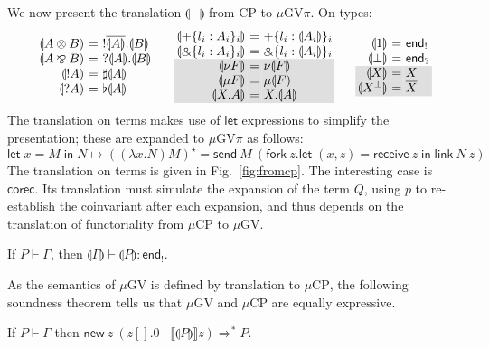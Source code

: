 \documentclass[orivec,envcountsame]{llncs}
\makeatletter
\newcommand{\with}{\mathbin\binampersand}
\newcommand{\parr}{\mathbin\bindnasrepma}
\newcommand{\cpdual}[1]{#1^\perp}
\newcommand{\cpbang}[1]{{! #1}}
\newcommand{\cpquery}[1]{{? #1}}
\newcommand{\gvdual}[1]{\overline{#1}}
\newcommand{\gvout}[2]{{!#1.#2}}
\newcommand{\gvin}[2]{{?#1.#2}}
\newcommand{\outterm}{\mkwd{end}_!}
\newcommand{\interm}{\mkwd{end}_?}
\newcommand{\gvserver}[1]{\flat #1}
\newcommand{\gvservice}[1]{\sharp #1}
\newcommand{\cptyp}[2]{#1 \vdash #2}
\newcommand{\gvtyp}[3]{#1 \vdash #2 : #3}
\newcommand{\mkwd}[1]{\mathsf{#1}}
\newcommand{\cut}[4]{\mkwd{new}\:#1 \: (#3 \mid #4)}
\newcommand{\gvsend}[2]{\mkwd{send}\:#1\:#2}
\newcommand{\gvreceive}[1]{\mkwd{receive}\:#1}
\newcommand{\gvlet}[3]{\mkwd{let}\;#1 = #2\;\mkwd{in}\;#3}
\newcommand{\gvlink}[2]{\mkwd{link}\:#1\:#2}
\newcommand{\gvfork}[2]{\mkwd{fork}\:#1.#2}
\newcommand{\gvreceivek}[4]{\gvlet{({#1}, {#2})}{\gvreceive{#3}}{#4}}
\newcommand{\key}{\mkwd}
\newcommand{\tocp}[1]{\llbracket #1 \rrbracket}
\newcommand{\togv}[1]{\llparenthesis #1 \rrparenthesis}
\newcommand{\topi}[1]{({#1})^\star}
\newcommand{\mucp}{$\mu\mathrm{CP}$\xspace}
\newcommand{\mugv}{$\mu\mathrm{GV}$\xspace}
\newcommand{\gvpi}{$\mu\mathrm{GV}\pi$\xspace}
\newcommand{\ba}{\begin{array}}
\newcommand{\ea}{\end{array}}
\newenvironment{eqs}{\ba{@{}r@{~}c@{~}l@{}}}{\ea}
\newcommand\shaderow{\noalign{\vskip-0.4pt}\rowcolor{shade}[0.6mm]}
\makeatother
\begin{document}
We now present the translation $\togv{-}$ from CP to \gvpi. On types:
\small\[
\ba{@{}c@{\qquad}c@{\qquad}c@{}}
\begin{eqs}
\togv{A \otimes B} &=& \gvout{\gvdual{\togv{A}}}{\togv{B}} \\
\togv{A \parr B}   &=& \gvin{\togv{A}}{\togv{B}} \\
\togv{\cpbang{A}}   &=& \gvservice{\togv{A}} \\
\togv{\cpquery{A}}  &=& \gvserver{\togv{A}} \\
\end{eqs}
&
\begin{eqs}
\togv{+\{l_i:A_i\}_i}     &=& +\{l_i:\togv{A_i}\}_i  \\
\togv{\with\{l_i:A_i\}_i} &=& \with\{l_i:\togv{A_i}\}_i \\ \shaderow
\togv{\nu F} &=& \nu \togv{F} \\ \shaderow
\togv{\mu F} &=& \mu \togv{F} \\ \shaderow
\togv{X.A} &=& X.\togv{A} \\
\end{eqs}
&
\begin{eqs}
\togv{1}           &=& \outterm \\
\togv{\bot}        &=& \interm \\ \shaderow
\togv{X}           &=& X \\ \shaderow
\togv{\cpdual{X}}  &=& \gvdual{X} \\
\end{eqs}
\ea
\]\normalsize
The translation on terms makes use of $\key{let}$ expressions to simplify the presentation; these
are expanded to \gvpi as follows:
\small\[
\gvlet{x}{M}{N} \mapsto
  \topi{(\lambda x.N) M} =
  \gvsend{M}{(\gvfork{z}{\gvreceivek{x}{z}{z}{\gvlink{N}{z}}})}
\]\normalsize%
The translation on terms is given in Fig.~\ref{fig:fromcp}. The interesting case is
$\key{corec}$. Its translation must simulate the expansion of the term $Q$, using $p$ to
re-establish the coinvariant after each expansion, and thus depends on the translation of
functoriality from \mucp to \mugv.

\begin{theorem}
  If $\cptyp{P}{\Gamma}$, then $\gvtyp{\togv{\Gamma}}{\togv{P}}{\outterm}$.
\end{theorem}
%
%
As the semantics of \mugv is defined by translation to \mucp, the following soundness theorem tells
us that \mugv and \mucp are equally expressive.
\begin{theorem}
\label{th:soundness}
If $\cptyp{P}{\Gamma}$ then $\cut{z}{}{z[].0}{\tocp{\togv{P}}z} \Longrightarrow^* P$.
\end{theorem}
%
\end{document}
